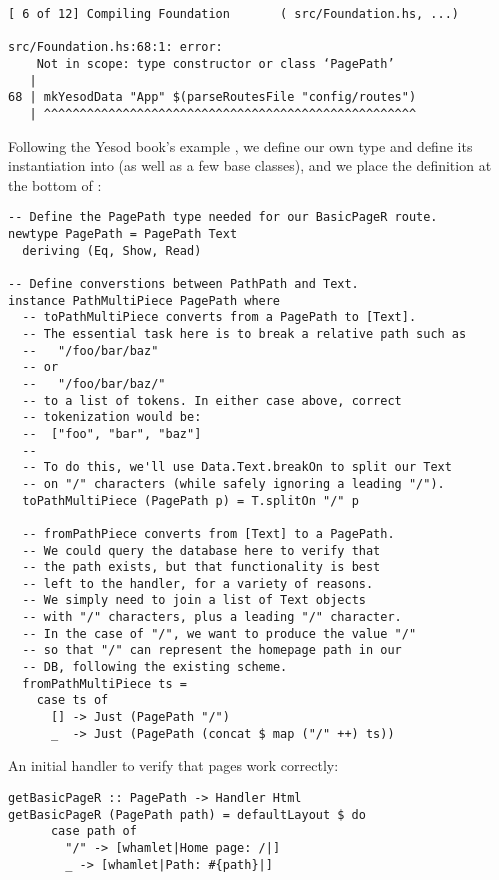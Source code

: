 \begin{Verbatim}
[ 6 of 12] Compiling Foundation       ( src/Foundation.hs, ...)

src/Foundation.hs:68:1: error:
    Not in scope: type constructor or class ‘PagePath’
   |
68 | mkYesodData "App" $(parseRoutesFile "config/routes")
   | ^^^^^^^^^^^^^^^^^^^^^^^^^^^^^^^^^^^^^^^^^^^^^^^^^^^^

\end{Verbatim}

Following the Yesod book's example \cite{ybkRouting}, we define our own  type and define its instantiation into  (as well as a few base classes), and we place the definition at the bottom of :

\begin{Verbatim}
-- Define the PagePath type needed for our BasicPageR route.
newtype PagePath = PagePath Text
  deriving (Eq, Show, Read)

-- Define converstions between PathPath and Text.
instance PathMultiPiece PagePath where
  -- toPathMultiPiece converts from a PagePath to [Text].
  -- The essential task here is to break a relative path such as
  --   "/foo/bar/baz"
  -- or
  --   "/foo/bar/baz/"
  -- to a list of tokens. In either case above, correct
  -- tokenization would be:
  --  ["foo", "bar", "baz"]
  --
  -- To do this, we'll use Data.Text.breakOn to split our Text
  -- on "/" characters (while safely ignoring a leading "/").
  toPathMultiPiece (PagePath p) = T.splitOn "/" p

  -- fromPathPiece converts from [Text] to a PagePath.
  -- We could query the database here to verify that
  -- the path exists, but that functionality is best
  -- left to the handler, for a variety of reasons.
  -- We simply need to join a list of Text objects
  -- with "/" characters, plus a leading "/" character.
  -- In the case of "/", we want to produce the value "/"
  -- so that "/" can represent the homepage path in our
  -- DB, following the existing scheme.
  fromPathMultiPiece ts =
    case ts of
      [] -> Just (PagePath "/")
      _  -> Just (PagePath (concat $ map ("/" ++) ts))
\end{Verbatim}


An initial handler to verify that pages work correctly:

\begin{Verbatim}
getBasicPageR :: PagePath -> Handler Html
getBasicPageR (PagePath path) = defaultLayout $ do
      case path of
        "/" -> [whamlet|Home page: /|]
        _ -> [whamlet|Path: #{path}|]
\end{Verbatim}

